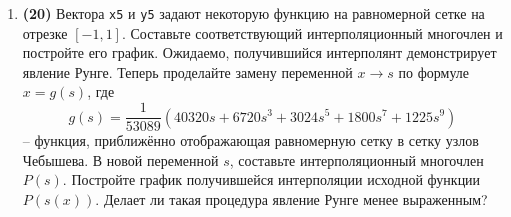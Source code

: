 \documentclass[prb,papersize=a4paper,notitlepage]{revtex4-1}%
\begin{document}
\begin{enumerate}
\item \textbf{(20)} Вектора \lstinline{x5} и \lstinline{y5} задают некоторую функцию на равномерной сетке на отрезке $[-1, 1]$. Составьте соответствующий интерполяционный многочлен и постройте его график. Ожидаемо, получившийся интерполянт демонстрирует явление Рунге. Теперь проделайте замену переменной $x\to s$ по формуле $x = g(s)$, где 
$$
g(s) = \frac{1}{53089}\left(40320 s + 6720 s^3 + 3024 s^5 + 1800 s^7 + 1225 s^9\right)
$$
 -- функция, приближённо отображающая равномерную сетку в сетку узлов Чебышева. В новой переменной $s$, составьте интерполяционный многочлен $P(s)$. Постройте график получившейся интерполяции исходной функции $P(s(x))$. Делает ли такая процедура явление Рунге менее выраженным?

\end{enumerate} 
\end{document}
